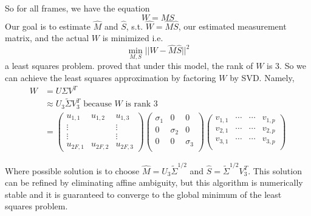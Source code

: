 So for all frames, we have the equation $$W = MS$$
Our goal is to estimate $\hat M$ and $\hat S$, s.t. $\hat W = \hat M
\hat S$, our estimated
measurement matrix, and the actual $W$ is minimized i.e. $$\min_{M,
  S}||W- \hat M \hat S||^2$$
a least squares problem.
\cite{Tomasi} proved that under this model, the rank of $W$ is 3. So
we can achieve the least squares approximation by factoring $W$ by
SVD. Namely, 
\begin{align*}
W &= U\Sigma V^T\\
&\approx U_3\tilde \Sigma V_3^T \text{ because $W$ is rank 3}\\
&=
\begin{pmatrix}
  u_{1,1} & u_{1,2} & u_{1,3} \\ \vdots & & \vdots
\\ \vdots & & \vdots
\\   u_{2F,1} & u_{2F,2} & u_{2F,3} 
\end{pmatrix}
\begin{pmatrix}
  \sigma_1 & 0 & 0 \\
  0 & \sigma_2 & 0 \\
  0 & 0 & \sigma_3 \\
\end{pmatrix}
\begin{pmatrix}
  v_{1,1} &  \cdots &\cdots & v_{1,p}\\
  v_{2,1} &  \cdots &\cdots & v_{2,p}\\
  v_{3,1} &  \cdots &\cdots & v_{3,p}\\
\end{pmatrix}
\end{align*}

Where possible solution is to choose $\hat M = U_3\tilde \Sigma^{1/2}$
and $\hat S =\tilde \Sigma^{1/2}V_3^T$. This solution can be refined
by eliminating affine ambiguity, but this algorithm is numerically
stable and it is guaranteed to converge to the global minimum of the
least squares problem.




